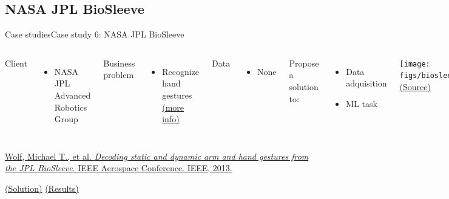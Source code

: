 \documentclass[10pt,compress]{beamer} %
\begin{document}
\subsection{NASA JPL BioSleeve}
\begin{frame}{Case studies}{Case study 6: NASA JPL BioSleeve}
	\vspace{-0.5cm}
    \begin{columns}
	   \small{
		Client
		\begin{itemize}
			\item NASA JPL Advanced Robotics Group
		\end{itemize}
		Business problem
		\begin{itemize}
			\item Recognize hand gestures \href{https://spectrum.ieee.org/automaton/robotics/robotics-hardware/jpl-biosleeve-enables-precise-robot-control-through-hand-and-arm-gestures}{(more info)}
		\end{itemize}
		Data
		\begin{itemize}
			\item None
		\end{itemize}
		Propose a solution to:
		\begin{itemize}
            \item Data adquisition
			\item ML task
		\end{itemize}
		}

			\texttt{[image: figs/biosleeve.jpeg]}\\
			\tiny \centering \href{https://dces.essex.ac.uk/staff/hhu/Papers/CTS2013-San\%20Diego.pdf}{(Source)}

			\texttt{[image: figs/biosleeve2.jpg]}\\
			\tiny \centering \href{https://www-robotics.jpl.nasa.gov/tasks/showBrowseImage.cfm?TaskID=277&tdaID=700081}{(Source)}
    \end{columns}

    \normalsize \href{https://dl.acm.org/citation.cfm?id=2447571}{Wolf, Michael T., et al. \textit{Decoding static and dynamic arm and hand gestures from the JPL BioSleeve}. IEEE Aerospace Conference. IEEE, 2013.}\\

	\vspace{0.3cm}

    \centering \href{https://www.semanticscholar.org/paper/JPL-BioSleeve-for-gesture-based-control\%3A-Technology-Assad-Wolf/18152a964e128e247a706dc8729036369b536b48/figure/2}{(Solution)} \href{https://www.youtube.com/watch?v=BGfDyqAE86U}{(Results)}
\end{frame}
\end{document}
